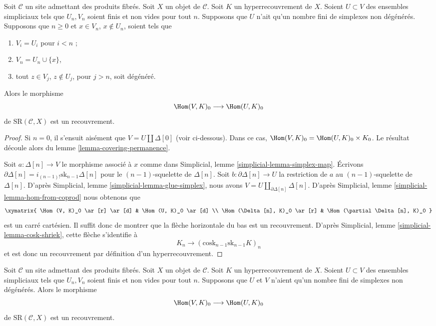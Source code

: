 \begin{lemma}
\label{lemma-one-more-simplex}
Soit $\mathcal{C}$ un site admettant des produits fibrés.
Soit $X$ un objet de $\mathcal{C}$.
Soit $K$ un hyperrecouvrement de $X$.
Soient $U \subset V$ des ensembles simpliciaux tels que $U_n, V_n$
soient finis et non vides pour tout $n$.
Supposons que $U$ n'ait qu'un nombre fini de simplexes non dégénérés.
Supposons que $n \geq 0$ et $x \in V_n$,
$x \not \in U_n$, soient tels que
\begin{enumerate}
\item $V_i = U_i$ pour $i < n$ ;
\item $V_n = U_n \cup \{x\}$,
\item tout $z \in V_j$, $z \not \in U_j$, pour $j > n$,
soit dégénéré.
\end{enumerate}
Alors le morphisme
$$
\Hom(V, K)_0
\longrightarrow
\Hom(U, K)_0
$$
de $\text{SR}(\mathcal{C}, X)$ est un recouvrement.
\end{lemma}

\begin{proof}
Si $n = 0$, il s'ensuit aisément que $V = U \amalg \Delta[0]$
(voir ci-dessous). Dans ce cas, $\Hom(V, K)_0 =
\Hom(U, K)_0 \times K_0$. Le résultat découle alors
du lemme \ref{lemma-covering-permanence}.

\medskip\noindent
Soit $a : \Delta[n] \to V$ le morphisme associé à $x$
comme dans Simplicial, lemme \ref{simplicial-lemma-simplex-map}.
Écrivons $\partial \Delta[n] = i_{(n-1)!} \text{sk}_{n - 1} \Delta[n]$
pour le $(n - 1)$-squelette de $\Delta[n]$.
Soit $b : \partial \Delta[n] \to U$ la restriction
de $a$ au $(n - 1)$-squelette de $\Delta[n]$. D'après
Simplicial, lemme \ref{simplicial-lemma-glue-simplex},
nous avons $V = U \amalg_{\partial \Delta[n]} \Delta[n]$. D'après
Simplicial, lemme
\ref{simplicial-lemma-hom-from-coprod}
nous obtenons que
$$
\xymatrix{
\Hom(V, K)_0 \ar[r] \ar[d] &
\Hom(U, K)_0 \ar[d] \\
\Hom(\Delta[n], K)_0 \ar[r] &
\Hom(\partial \Delta[n], K)_0
}
$$
est un carré cartésien. Il suffit donc de montrer que
la flèche horizontale du bas est un recouvrement. D'après
Simplicial, lemme \ref{simplicial-lemma-cosk-shriek},
cette flèche s'identifie à
$$
K_n \to (\text{cosk}_{n - 1} \text{sk}_{n - 1} K)_n
$$
et est donc un recouvrement par définition d'un hyperrecouvrement.
\end{proof}

\begin{lemma}
\label{lemma-add-simplices}
Soit $\mathcal{C}$ un site admettant des produits fibrés.
Soit $X$ un objet de $\mathcal{C}$.
Soit $K$ un hyperrecouvrement de $X$.
Soient $U \subset V$ des ensembles simpliciaux tels que $U_n, V_n$
soient finis et non vides pour tout $n$.
Supposons que $U$ et $V$ n'aient qu'un nombre fini de simplexes non dégénérés.
Alors le morphisme
$$
\Hom(V, K)_0
\longrightarrow
\Hom(U, K)_0
$$
de $\text{SR}(\mathcal{C}, X)$ est un recouvrement.
\end{lemma}

